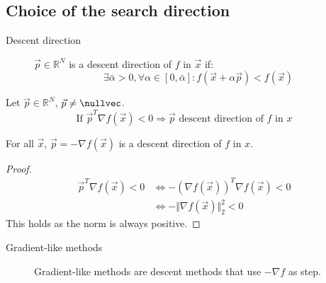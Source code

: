 \subsection{Choice of the search direction}

\begin{description}
    \item[Descent direction] 
        $\vec{p} \in \mathbb{R}^N$ is a descent direction of $f$ in $\vec{x}$ if:
        \[ \exists \bar{\alpha} > 0, \forall \alpha \in [0, \bar{\alpha}]: f(\vec{x} + \alpha \vec{p}) < f(\vec{x}) \]
\end{description}

\begin{theorem}
    Let $\vec{p} \in \mathbb{R}^N$, $\vec{p} \neq \nullvec$.
    \[ \text{If } \vec{p}^T \nabla f(\vec{x}) < 0 \Rightarrow \vec{p} \text{ descent direction of } f \text{ in } x \]
\end{theorem}

\begin{theorem}
    For all $\vec{x}$, $\vec{p} = -\nabla f(\vec{x})$ is a descent direction of $f$ in $x$.
\end{theorem}
\begin{proof}
    \[
        \begin{split}
            \vec{p}^T \nabla f(\vec{x}) < 0 &\iff -(\nabla f(\vec{x}))^T \nabla f(\vec{x}) < 0 \\
                &\iff - \Vert \nabla f(\vec{x}) \Vert_2^2 < 0
        \end{split}
    \]
    This holds as the norm is always positive.
\end{proof}

\begin{description}
    \item[Gradient-like methods] 
        Gradient-like methods are descent methods that use $-\nabla f$ as step.
\end{description}


